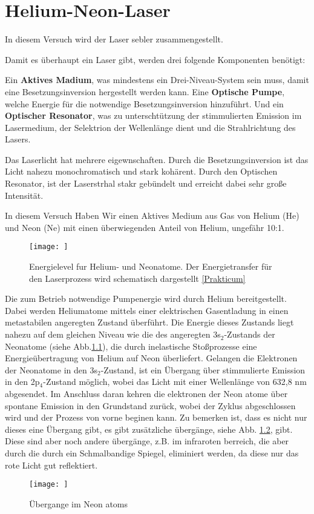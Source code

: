 \chapter{Helium-Neon-Laser} \label{aufbau helium neon laser}

In diesem Versuch wird der Laser sebler zusammengestellt.

Damit es überhaupt ein Laser gibt, werden drei folgende Komponenten benötigt:

Ein \textbf{Aktives Madium}, was mindestens ein Drei-Niveau-System sein muss, damit eine Besetzungsinversion hergestellt werden kann.
Eine \textbf{Optische Pumpe}, welche Energie für die notwendige Besetzungsinversion hinzuführt.
Und ein \textbf{Optischer Resonator}, was zu unterschtützung der stimmulierten Emission im Lasermedium, der Selektrion der Wellenlänge dient und die Strahlrichtung des Lasers.

Das Laserlicht hat mehrere eigewnschaften. Durch die Besetzungsinversion ist das Licht nahezu monochromatisch und stark kohärent.
Durch den Optischen Resonator, ist der Laserstrhal stakr gebündelt und erreicht dabei sehr große Intensität.

In diesem Versuch Haben Wir einen Aktives Medium aus Gas von Helium (He) und Neon (Ne) mit einen überwiegenden Anteil von Helium, ungefähr 10:1. 

\FloatBarrier
\begin{figure}[htbp]
    \centering
    \texttt{[image: ]}
    \caption{Energielevel fur Helium- und Neonatome. Der Energietransfer für den Laserprozess wird schematisch dargestellt \ref{Prakticum}}
    \label{fig:He-Ne}
\end{figure}
\FloatBarrier

Die zum Betrieb notwendige Pumpenergie wird durch Helium bereitgestellt. 
Dabei werden Heliumatome mittels einer elektrischen Gasentladung in einen metastabilen angeregten Zustand überführt. 
Die Energie dieses Zustands liegt nahezu auf dem gleichen Niveau wie die des angeregten 3s$_2$-Zustands der Neonatome (siehe Abb.\ref{fig:He-Ne}), die durch inelastische Stoßprozesse eine Energieübertragung von Helium auf Neon überliefert.
Gelangen die Elektronen der Neonatome in den 3s$_2$-Zustand, ist ein Übergang über stimmulierte Emission in den 2p$_4$-Zustand möglich, wobei das Licht mit einer Wellenlänge von 632,8 nm abgesendet.
Im Anschluss daran kehren die elektronen der Neon atome über spontane Emission in den Grundstand zurück, wobei der Zyklus abgeschlossen wird und der Prozess von vorne beginen kann.
Zu bemerken ist, dass es nicht nur dieses eine Übergang gibt, es gibt zusätzliche übergänge, siehe Abb. \ref{fig:Übergang}, gibt.
Diese sind aber noch andere übergänge, z.B. im infraroten berreich, die aber durch die durch ein Schmalbandige Spiegel, eliminiert werden, da diese nur das rote Licht gut reflektiert.
\FloatBarrier
\begin{figure}[htbp]
    \centering
    \texttt{[image: ]}
    \caption{Übergange im Neon atoms}
    \label{fig:Übergang}
\end{figure}


